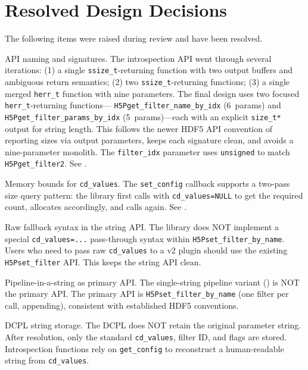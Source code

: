 \documentclass[../HDF5_RFC.tex]{subfiles}
\begin{document}
\section{Resolved Design Decisions}
\label{sec:resolved}

The following items were raised during review and have been resolved.

API naming and signatures. The introspection API went through several
iterations: (1) a single \texttt{ssize\_t}-returning function with two output buffers
and ambiguous return semantics; (2) two \texttt{ssize\_t}-returning functions; (3) a
single merged \texttt{herr\_t} function with nine parameters. The final design uses
two focused \texttt{herr\_t}-returning functions---
\texttt{H5Pget\_filter\_name\_by\_idx} (6~params) and \texttt{H5Pget\_filter\_params\_by\_idx}
(5~params)---each with an explicit \texttt{size\_t*} output for string length. This
follows the newer HDF5 API convention of reporting sizes via output
parameters, keeps each signature clean, and avoids a nine-parameter monolith.
The \texttt{filter\_idx} parameter uses \texttt{unsigned} to match \texttt{H5Pget\_filter2}. See
.

Memory bounds for \texttt{cd\_values}. The \texttt{set\_config} callback supports a
two-pass size query pattern: the library first calls with \texttt{cd\_values=NULL} to
get the required count, allocates accordingly, and calls again. See
.

Raw fallback syntax in the string API. The library does NOT implement a
special \texttt{cd\_values=...} pass-through syntax within
\texttt{H5Pset\_filter\_by\_name}. Users who need to pass raw \texttt{cd\_values} to a v2
plugin should use the existing \texttt{H5Pset\_filter} API. This keeps the string
API clean.

Pipeline-in-a-string as primary API. The single-string pipeline
variant () is NOT the primary API. The primary
API is \texttt{H5Pset\_filter\_by\_name} (one filter per call, appending), consistent
with established HDF5 conventions.

DCPL string storage. The DCPL does NOT retain the original parameter
string. After resolution, only the standard \texttt{cd\_values}, filter ID, and flags
are stored. Introspection functions rely on \texttt{get\_config} to reconstruct a
human-readable string from \texttt{cd\_values}.
\end{document}

